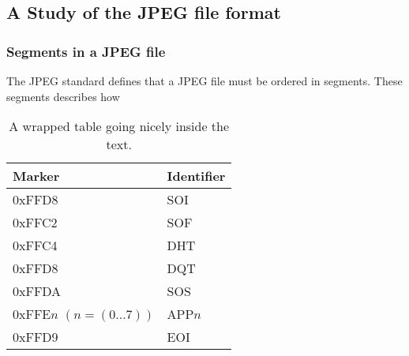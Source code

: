 \begin{infobox}{\section[A Study of the JPEG file format]{A Study of the JPEG file format}}
\subsubsection*{Segments in a JPEG file}

The JPEG standard defines that a JPEG file must be ordered in segments. These segments describes how 
\begin{wraptable}{r}{5.5cm}
\caption{A wrapped table going nicely inside the text.}\label{wrap-tab:1}
\begin{tabular}{|p{2.5cm}|l|}
\hline
Marker & Identifier\\ \hline
0xFFD8 & SOI\\ \hline
0xFFC2 & SOF \\ \hline
0xFFC4 & DHT\\ \hline
0xFFD8 & DQT \\ \hline
0xFFDA & SOS\\ \hline
0xFFE$n$ \newline$(n = (0 \ldots 7))$ & APP$n$\\ \hline
0xFFD9 & EOI\\ \hline 
\end{tabular}
\end{wraptable}


\begin{centering}
\end{centering}


\end{infobox}
